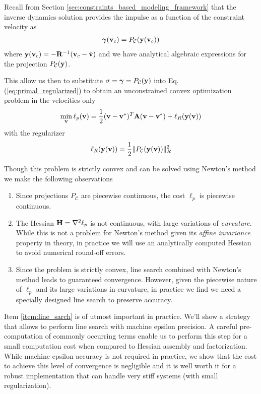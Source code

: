 Recall from Section \ref{sec:constraints_based_modeling_framework} that the
inverse dynamics solution provides the impulse as a function of the constraint
velocity as
\begin{eqnarray}
	{\bm\gamma}({\mathbf{v}}_c) = P_\mathcal{C}({\mathbf{y}}({\mathbf{v}}_c))
\end{eqnarray}
where ${\mathbf{y}}({\mathbf{v}}_c) = -{\mathbf{R}}^{-1}({\mathbf{v}}_c-\hat{{\mathbf{v}}})$ and we have
analytical algebraic expressions for the projection $P_\mathcal{C}({\mathbf{y}})$.

This allow us then to substitute ${\mathbf{\sigma}}={\bm\gamma}=P_\mathcal{C}({\mathbf{y}})$
into Eq. (\ref{eq:primal_regularized}) to obtain an unconstrained convex
optimization problem in the velocities only
\begin{eqnarray}
	\min_{\mf{v}} \ell_p(\mf{v}) =
	\frac{1}{2}(\mf{v}-\mf{v}^*)^T\mf{A}(\mf{v}-\mf{v}^*) +
	\ell_R(\mf{y}(\mf{v}))
	\label{eq:primal_unconstrained}
\end{eqnarray}
with the regularizer
\begin{equation}
	\ell_R({\mathbf{y}}({\mathbf{v}})) = \frac{1}{2}\Vert P_\mathcal{C}({\mathbf{y}}({\mathbf{v}}))\Vert_R^2
\end{equation}

Though this problem is strictly convex and can be solved using Newton's method
we make the following observations
\begin{enumerate}
	\item Since projections $P_\mathcal{C}$ are piecewise continuous, the cost
	$\ell_p$ is piecewise continuous.
	\item The Hessian ${\mathbf{H}}=\nabla^2\ell_p$ is not continuous, with large
	variations of \textit{curvature}. While this is not a problem for Newton's
	method given its \textit{affine invariance} property in theory, in practice
	we will use an analytically computed Hessian to avoid numerical round-off
	errors.
	\item\label{item:line_sarch} Since the problem is strictly convex, line
	search combined with Newton's method leads to guaranteed convergence.
	However, given the piecewise nature of $\ell_p$ and its large variations in
	curvature, in practice we find we need a specially designed line search to
	preserve accuracy.
\end{enumerate}

Item \ref{item:line_sarch} is of utmost important in practice. We'll show a
strategy that allows to perform line search with machine epsilon precision. A
careful pre-computation of commonly occurring terms enable us to perform this
step for a small computation cost when compared to Hessian assembly and
factorization. While machine epsilon accuracy is not required in practice, we
show that the cost to achieve this level of convergence is negligible and it is
well worth it for a robust implementation that can handle very stiff systems
(with small regularization).

